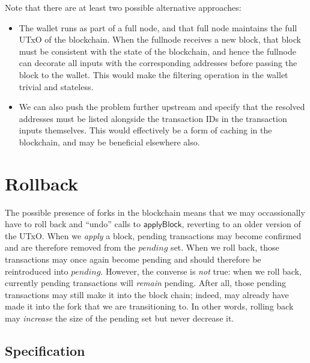 \documentclass{article}
\begin{document}
Note that there are at least two possible alternative approaches:

\begin{itemize}
\item The wallet runs as part of a full node, and that full node maintains
the full UTxO of the blockchain. When the fullnode receives a new block,
that block must be consistent with the state of the blockchain, and hence
the fullnode can decorate all inputs with the corresponding addresses before
passing the block to the wallet. This would make the filtering operation in
the wallet trivial and stateless.
\item We can also push the problem further upstream and specify that the
resolved addresses must be listed alongside the transaction IDs in the
transaction inputs themselves. This would effectively be a form of caching
in the blockchain, and may be beneficial elsewhere also.
\end{itemize}

\section{Rollback}

The possible presence of forks in the blockchain means that we may occassionally
have to roll back and ``undo'' calls to $\mathsf{applyBlock}$, reverting to an
older version of the UTxO. When we \emph{apply} a block, pending transactions
may become confirmed and are therefore removed from the $\mathit{pending}$ set.
When we roll back, those transactions may once again become pending and should
therefore be reintroduced into $\mathit{pending}$. However, the converse is
\emph{not} true: when we roll back, currently pending transactions will
\emph{remain} pending. After all, those pending transactions may still make it
into the block chain; indeed, may already have made it into the fork that we are
transitioning to. In other words, rolling back may \emph{increase} the size of
the pending set but never decrease it.

\subsection{Specification}
\label{sec:rollback_spec}
\end{document}
